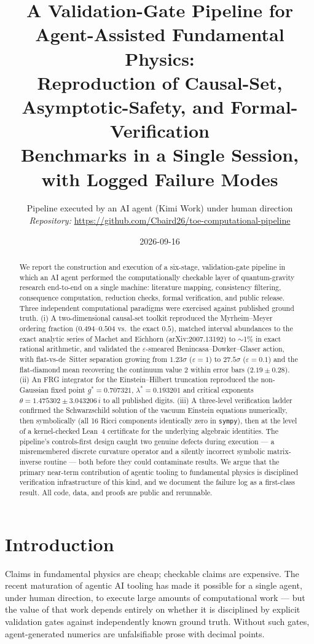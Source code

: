 \documentclass[11pt]{article}
\title{A Validation-Gate Pipeline for Agent-Assisted Fundamental Physics:\\
Reproduction of Causal-Set, Asymptotic-Safety, and Formal-Verification\\
Benchmarks in a Single Session, with Logged Failure Modes}
\author{Pipeline executed by an AI agent (Kimi Work) under human direction\\
\textit{Repository:} \url{https://github.com/Cbaird26/toe-computational-pipeline}}
\date{2026-09-16}
\begin{document}
\maketitle

\begin{abstract}
We report the construction and execution of a six-stage, validation-gate
pipeline in which an AI agent performed the computationally checkable layer of
quantum-gravity research end-to-end on a single machine: literature mapping,
consistency filtering, consequence computation, reduction checks, formal
verification, and public release. Three independent computational paradigms
were exercised against published ground truth. (i) A two-dimensional
causal-set toolkit reproduced the Myrheim--Meyer ordering fraction
($0.494$--$0.504$ vs.\ the exact $0.5$), matched interval abundances to the
exact analytic series of Machet and Eichhorn (arXiv:2007.13192) to $\sim$1\%
in exact rational arithmetic, and validated the $\varepsilon$-smeared
Benincasa--Dowker--Glaser action, with flat-vs-de~Sitter separation growing
from $1.23\sigma$ ($\varepsilon{=}1$) to $27.5\sigma$ ($\varepsilon{=}0.1$)
and the flat-diamond mean recovering the continuum value $2$ within error bars
($2.19 \pm 0.28$). (ii) An FRG integrator for the Einstein--Hilbert truncation
reproduced the non-Gaussian fixed point $g^* = 0.707321$,
$\lambda^* = 0.193201$ and critical exponents
$\theta = 1.475302 \pm 3.043206\,i$ to all published digits. (iii) A
three-level verification ladder confirmed the Schwarzschild solution of the
vacuum Einstein equations numerically, then symbolically (all 16 Ricci
components identically zero in \texttt{sympy}), then at the level of a
kernel-checked Lean~4 certificate for the underlying algebraic identities.
The pipeline's controls-first design caught two genuine defects during
execution --- a misremembered discrete curvature operator and a silently
incorrect symbolic matrix-inverse routine --- both before they could
contaminate results. We argue that the primary near-term contribution of
agentic tooling to fundamental physics is disciplined verification
infrastructure of this kind, and we document the failure log as a first-class
result. All code, data, and proofs are public and rerunnable.
\end{abstract}

\section{Introduction}

Claims in fundamental physics are cheap; checkable claims are expensive. The
recent maturation of agentic AI tooling has made it possible for a single
agent, under human direction, to execute large amounts of computational work
--- but the value of that work depends entirely on whether it is disciplined
by explicit validation gates against independently known ground truth.
Without such gates, agent-generated numerics are unfalsifiable prose with
decimal points.
\end{document}
